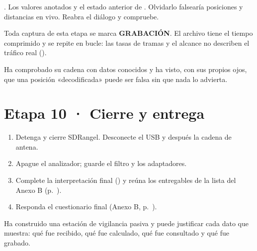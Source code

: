 {.}
{Los valores anotados y el estado anterior de .}
{Olvidarlo falsearía posiciones y distancias en vivo.}
{}
{Reabra el diálogo y compruebe.}
{}

\begin{importante}
Toda captura de esta etapa se marca \textbf{GRABACIÓN}. El archivo tiene el tiempo comprimido y se repite en bucle: las tasas de tramas y el alcance no describen el tráfico real ().
\end{importante}

\begin{logro}
Ha comprobado su cadena con datos conocidos y ha visto, con sus propios ojos, que una posición «decodificada» puede ser falsa sin que nada lo advierta.
\end{logro}

\section{Etapa 10 · Cierre y entrega}
\label{sec:u-informe}

\begin{enumerate}
  \item Detenga y cierre SDRangel. Desconecte el USB y después la cadena de antena.
  \item Apague el analizador; guarde el filtro y los adaptadores.
  \item Complete la interpretación final () y reúna los entregables de la lista del Anexo B (p.~\pageref{B-sec:b-entregau}).
  \item Responda el cuestionario final (Anexo B, p.~\pageref{B-sec:b-finalu}).
\end{enumerate}

\begin{logro}
Ha construido una estación de vigilancia pasiva y puede justificar cada dato que muestra: qué fue recibido, qué fue calculado, qué fue consultado y qué fue grabado.
\end{logro}

